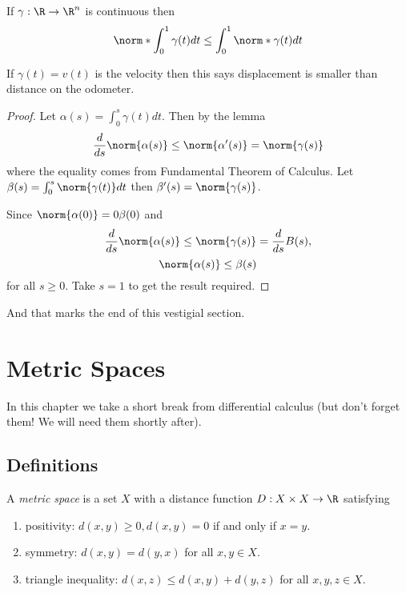 \documentclass[a4paper]{article}
\theoremstyle{definition}
\begin{document}
\begin{corollary}
  \label{cor:distance and displacement}
  If \(\gamma: \R \to \R^n\) is continuous then
  \[
    \norm*{\int_{0}^{1} \gamma(t) dt} \leq \int_{0}^{1} \norm*{\gamma(t)} dt
  \]
\end{corollary}

\begin{note}
  If \(\gamma(t) = v(t)\) is the velocity then this says displacement is smaller than distance on the odometer.
\end{note}

\begin{proof}
  Let \(\alpha(s) = \int_{0}^{s} \gamma(t) dt\). Then by the lemma
  \[
    \frac{d}{ds} \norm{\alpha(s)} \leq \norm{\alpha'(s)} = \norm{\gamma(s)}
  \]
  where the equality comes from Fundamental Theorem of Calculus. Let \(\beta(s) = \int_{0}^{s} \norm{\gamma(t)} dt\) then \(\beta'(s) = \norm{\gamma(s)}\).

  Since \(\norm{\alpha(0)} = 0 \beta(0)\) and
  \[
    \frac{d}{ds} \norm{\alpha(s)} \leq \norm{\gamma(s)} = \frac{d}{ds} B(s),
  \]
  \[
    \norm{\alpha(s)} \leq \beta(s)
  \]
  for all \(s \geq 0\). Take \(s = 1\) to get the result required.
\end{proof}

And that marks the end of this vestigial section.

\section{Metric Spaces}

In this chapter we take a short break from differential calculus (but don't forget them! We will need them shortly after).

\subsection{Definitions}

\begin{definition}
  A \emph{metric space} is a set \(X\) with a distance function \(D: X \times X \to \R\) satisfying
  \begin{enumerate}
  \item positivity: \(d(x, y) \geq 0, d(x, y) = 0\) if and only if \(x = y\).
  \item symmetry: \(d(x, y) = d(y, x)\) for all \(x, y \in X\).
  \item triangle inequality: \(d(x, z) \leq d(x, y) + d(y, z)\) for all \(x, y, z \in X\).
  \end{enumerate}
\end{definition}
\end{document}
